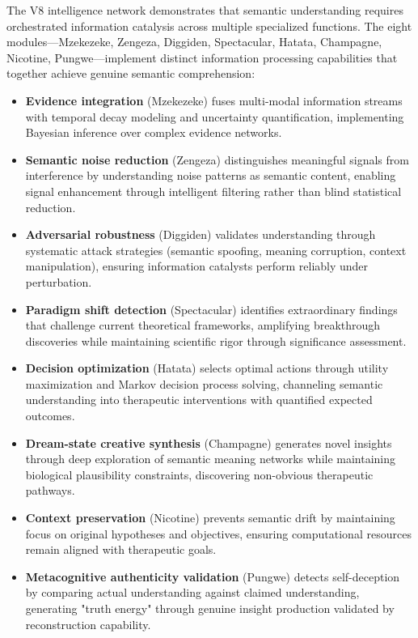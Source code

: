 \documentclass[12pt,a4paper]{article}
\theoremstyle{definition}
\theoremstyle{remark}
\begin{document}
The V8 intelligence network demonstrates that semantic understanding requires orchestrated information catalysis across multiple specialized functions. The eight modules—Mzekezeke, Zengeza, Diggiden, Spectacular, Hatata, Champagne, Nicotine, Pungwe—implement distinct information processing capabilities that together achieve genuine semantic comprehension:

\begin{itemize}
\item \textbf{Evidence integration} (Mzekezeke) fuses multi-modal information streams with temporal decay modeling and uncertainty quantification, implementing Bayesian inference over complex evidence networks.

\item \textbf{Semantic noise reduction} (Zengeza) distinguishes meaningful signals from interference by understanding noise patterns as semantic content, enabling signal enhancement through intelligent filtering rather than blind statistical reduction.

\item \textbf{Adversarial robustness} (Diggiden) validates understanding through systematic attack strategies (semantic spoofing, meaning corruption, context manipulation), ensuring information catalysts perform reliably under perturbation.

\item \textbf{Paradigm shift detection} (Spectacular) identifies extraordinary findings that challenge current theoretical frameworks, amplifying breakthrough discoveries while maintaining scientific rigor through significance assessment.

\item \textbf{Decision optimization} (Hatata) selects optimal actions through utility maximization and Markov decision process solving, channeling semantic understanding into therapeutic interventions with quantified expected outcomes.

\item \textbf{Dream-state creative synthesis} (Champagne) generates novel insights through deep exploration of semantic meaning networks while maintaining biological plausibility constraints, discovering non-obvious therapeutic pathways.

\item \textbf{Context preservation} (Nicotine) prevents semantic drift by maintaining focus on original hypotheses and objectives, ensuring computational resources remain aligned with therapeutic goals.

\item \textbf{Metacognitive authenticity validation} (Pungwe) detects self-deception by comparing actual understanding against claimed understanding, generating "truth energy" through genuine insight production validated by reconstruction capability.
\end{itemize}
\end{document}
